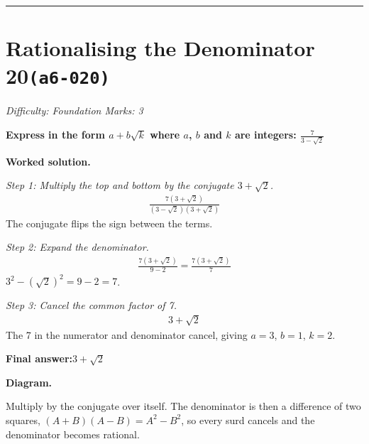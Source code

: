\documentclass[11pt]{article}
\newcommand{\question}[1]{\par\medskip\noindent\textbf{#1}\par}
\begin{document}
\medskip\hrule

\section*{Rationalising the Denominator 20\quad\small\texttt{(a6-020)}}
\textit{Difficulty: Foundation \quad\textbar\quad Marks: 3}

\question{Express in the form \( a + b\sqrt{k} \) where \( a \), \( b \) and \( k \) are integers: \( \frac{7}{3 - \sqrt{2}} \)}

\textbf{Worked solution.}

\textit{Step 1: Multiply the top and bottom by the conjugate \( 3 + \sqrt{2} \).}
\[\begin{gathered}
\frac{7(3 + \sqrt{2})}{(3 - \sqrt{2})(3 + \sqrt{2})}
\end{gathered}\]
The conjugate flips the sign between the terms.

\textit{Step 2: Expand the denominator.}
\[\begin{gathered}
\frac{7(3 + \sqrt{2})}{9 - 2} = \frac{7(3 + \sqrt{2})}{7}
\end{gathered}\]
\( 3^2 - (\sqrt{2})^2 = 9 - 2 = 7 \).

\textit{Step 3: Cancel the common factor of 7.}
\[\begin{gathered}
3 + \sqrt{2}
\end{gathered}\]
The 7 in the numerator and denominator cancel, giving \( a = 3 \), \( b = 1 \), \( k = 2 \).

\begin{answerbox}
\textbf{Final answer:}\quad \(\displaystyle 3 + \sqrt{2}\)
\end{answerbox}
\textbf{Diagram.}

\begin{center}
\end{center}
\small Multiply by the conjugate over itself. The denominator is then a difference of two squares, $(A+B)(A-B)=A^{2}-B^{2}$, so every surd cancels and the denominator becomes rational.\normalsize
\end{document}
